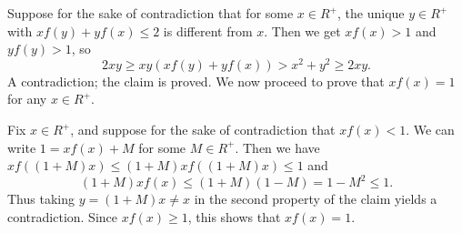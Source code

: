 \documentclass{article}
\begin{document}
Suppose for the sake of contradiction that for some $x \in R^+$, the unique $y \in R^+$ with $x f(y) + y f(x) \leq 2$ is different from $x$.
Then we get $x f(x) > 1$ and $y f(y) > 1$, so
\[ 2xy \geq xy (x f(y) + y f(x)) > x^2 + y^2 \geq 2xy. \]
A contradiction; the claim is proved.
We now proceed to prove that $x f(x) = 1$ for any $x \in R^+$.

Fix $x \in R^+$, and suppose for the sake of contradiction that $x f(x) < 1$.
We can write $1 = x f(x) + M$ for some $M \in R^+$.
Then we have $x f((1 + M) x) \leq (1 + M) x f((1 + M) x) \leq 1$ and
\[ (1 + M) x f(x) \leq (1 + M)(1 - M) = 1 - M^2 \leq 1. \]
Thus taking $y = (1 + M) x \neq x$ in the second property of the claim yields a contradiction.
Since $x f(x) \geq 1$, this shows that $x f(x) = 1$.
\end{document}
